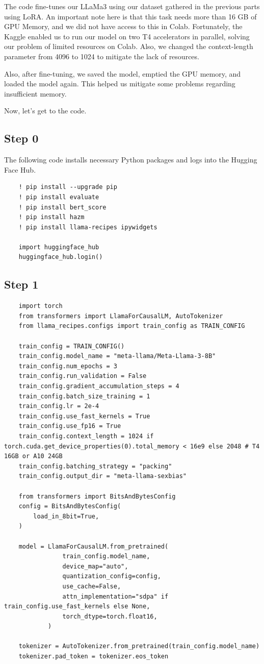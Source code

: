 \documentclass{solutionclass} %
\begin{document}
The code fine-tunes our LLaMa3 using our dataset gathered in the previous parts using LoRA. An important note here is that this task needs more than 16 GB of GPU Memory, and we did not have access to this in Colab. Fortunately, the Kaggle enabled us to run our model on two T4 accelerators in parallel, solving our problem of limited resources on Colab. Also, we changed the context-length parameter from 4096 to 1024 to mitigate the lack of resources.

Also, after fine-tuning, we saved the model, emptied the GPU memory, and loaded the model again. This helped us mitigate some problems regarding insufficient memory.

Now, let's get to the code.

\subsection*{Step 0}

The following code installs necessary Python packages and logs into the Hugging Face Hub.

\begin{verbatim}
	! pip install --upgrade pip
	! pip install evaluate
	! pip install bert_score
	! pip install hazm
	! pip install llama-recipes ipywidgets
	
	import huggingface_hub
	huggingface_hub.login()
\end{verbatim}


\subsection*{Step 1}


\begin{lstlisting}
	import torch
	from transformers import LlamaForCausalLM, AutoTokenizer
	from llama_recipes.configs import train_config as TRAIN_CONFIG
	
	train_config = TRAIN_CONFIG()
	train_config.model_name = "meta-llama/Meta-Llama-3-8B"
	train_config.num_epochs = 3
	train_config.run_validation = False
	train_config.gradient_accumulation_steps = 4
	train_config.batch_size_training = 1
	train_config.lr = 2e-4
	train_config.use_fast_kernels = True
	train_config.use_fp16 = True
	train_config.context_length = 1024 if torch.cuda.get_device_properties(0).total_memory < 16e9 else 2048 # T4 16GB or A10 24GB
	train_config.batching_strategy = "packing"
	train_config.output_dir = "meta-llama-sexbias"
	
	from transformers import BitsAndBytesConfig
	config = BitsAndBytesConfig(
		load_in_8bit=True,
	)
	
	model = LlamaForCausalLM.from_pretrained(
				train_config.model_name,
				device_map="auto",
				quantization_config=config,
				use_cache=False,
				attn_implementation="sdpa" if train_config.use_fast_kernels else None,
				torch_dtype=torch.float16,
			)
	
	tokenizer = AutoTokenizer.from_pretrained(train_config.model_name)
	tokenizer.pad_token = tokenizer.eos_token
\end{lstlisting}
\end{document}
